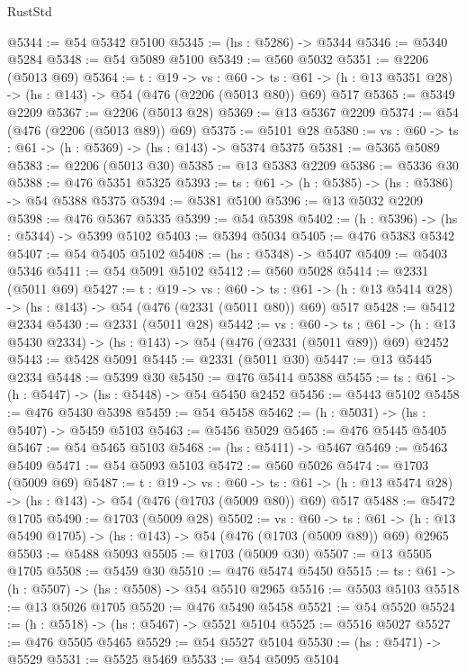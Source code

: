 \begin{lexlean}{RustStd}
\begin{coremodule}
@5344 := @54 @5342 @5100
@5345 := (hs : @5286) -> @5344
@5346 := @5340 @5284
@5348 := @54 @5089 @5100
@5349 := @560 @5032
@5351 := @2206 (@5013 @69)
@5364 := {t : @19} ->
  {vs : @60} ->
  {ts : @61} -> (h : @13 @5351 @28) -> (hs : @143) -> @54 (@476 (@2206 (@5013 @80)) @69) @517
@5365 := @5349 @2209
@5367 := @2206 (@5013 @28)
@5369 := @13 @5367 @2209
@5374 := @54 (@476 (@2206 (@5013 @89)) @69)
@5375 := @5101 @28
@5380 := {vs : @60} -> {ts : @61} -> (h : @5369) -> (hs : @143) -> @5374 @5375
@5381 := @5365 @5089
@5383 := @2206 (@5013 @30)
@5385 := @13 @5383 @2209
@5386 := @5336 @30
@5388 := @476 @5351 @5325
@5393 := {ts : @61} -> (h : @5385) -> (hs : @5386) -> @54 @5388 @5375
@5394 := @5381 @5100
@5396 := @13 @5032 @2209
@5398 := @476 @5367 @5335
@5399 := @54 @5398
@5402 := (h : @5396) -> (hs : @5344) -> @5399 @5102
@5403 := @5394 @5034
@5405 := @476 @5383 @5342
@5407 := @54 @5405 @5102
@5408 := (hs : @5348) -> @5407
@5409 := @5403 @5346
@5411 := @54 @5091 @5102
@5412 := @560 @5028
@5414 := @2331 (@5011 @69)
@5427 := {t : @19} ->
  {vs : @60} ->
  {ts : @61} -> (h : @13 @5414 @28) -> (hs : @143) -> @54 (@476 (@2331 (@5011 @80)) @69) @517
@5428 := @5412 @2334
@5430 := @2331 (@5011 @28)
@5442 := {vs : @60} ->
  {ts : @61} -> (h : @13 @5430 @2334) -> (hs : @143) -> @54 (@476 (@2331 (@5011 @89)) @69) @2452
@5443 := @5428 @5091
@5445 := @2331 (@5011 @30)
@5447 := @13 @5445 @2334
@5448 := @5399 @30
@5450 := @476 @5414 @5388
@5455 := {ts : @61} -> (h : @5447) -> (hs : @5448) -> @54 @5450 @2452
@5456 := @5443 @5102
@5458 := @476 @5430 @5398
@5459 := @54 @5458
@5462 := (h : @5031) -> (hs : @5407) -> @5459 @5103
@5463 := @5456 @5029
@5465 := @476 @5445 @5405
@5467 := @54 @5465 @5103
@5468 := (hs : @5411) -> @5467
@5469 := @5463 @5409
@5471 := @54 @5093 @5103
@5472 := @560 @5026
@5474 := @1703 (@5009 @69)
@5487 := {t : @19} ->
  {vs : @60} ->
  {ts : @61} -> (h : @13 @5474 @28) -> (hs : @143) -> @54 (@476 (@1703 (@5009 @80)) @69) @517
@5488 := @5472 @1705
@5490 := @1703 (@5009 @28)
@5502 := {vs : @60} ->
  {ts : @61} -> (h : @13 @5490 @1705) -> (hs : @143) -> @54 (@476 (@1703 (@5009 @89)) @69) @2965
@5503 := @5488 @5093
@5505 := @1703 (@5009 @30)
@5507 := @13 @5505 @1705
@5508 := @5459 @30
@5510 := @476 @5474 @5450
@5515 := {ts : @61} -> (h : @5507) -> (hs : @5508) -> @54 @5510 @2965
@5516 := @5503 @5103
@5518 := @13 @5026 @1705
@5520 := @476 @5490 @5458
@5521 := @54 @5520
@5524 := (h : @5518) -> (hs : @5467) -> @5521 @5104
@5525 := @5516 @5027
@5527 := @476 @5505 @5465
@5529 := @54 @5527 @5104
@5530 := (hs : @5471) -> @5529
@5531 := @5525 @5469
@5533 := @54 @5095 @5104

\end{coremodule}
\end{lexlean}
